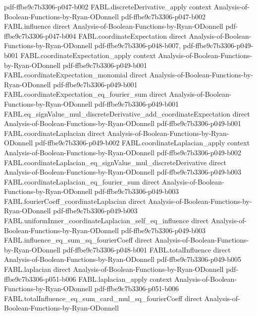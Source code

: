 \begin{theorem}
{    pdf-ffbe9c7b3306-p047-b002}
\proofstep
  {FABL.discreteDerivative_apply}
  {context}
  {Analysis-of-Boolean-Functions-by-Ryan-ODonnell}
  {pdf-ffbe9c7b3306-p047-b002}
\proofstep
  {FABL.influence}
  {direct}
  {Analysis-of-Boolean-Functions-by-Ryan-ODonnell}
  {pdf-ffbe9c7b3306-p047-b004}
\proofstep
  {FABL.coordinateExpectation}
  {direct}
  {Analysis-of-Boolean-Functions-by-Ryan-ODonnell}
  {pdf-ffbe9c7b3306-p048-b007,
    pdf-ffbe9c7b3306-p049-b001}
\proofstep
  {FABL.coordinateExpectation_apply}
  {context}
  {Analysis-of-Boolean-Functions-by-Ryan-ODonnell}
  {pdf-ffbe9c7b3306-p049-b001}
\proofstep
  {FABL.coordinateExpectation_monomial}
  {direct}
  {Analysis-of-Boolean-Functions-by-Ryan-ODonnell}
  {pdf-ffbe9c7b3306-p049-b001}
\proofstep
  {FABL.coordinateExpectation_eq_fourier_sum}
  {direct}
  {Analysis-of-Boolean-Functions-by-Ryan-ODonnell}
  {pdf-ffbe9c7b3306-p049-b001}
\proofstep
  {FABL.eq_signValue_mul_discreteDerivative_add_coordinateExpectation}
  {direct}
  {Analysis-of-Boolean-Functions-by-Ryan-ODonnell}
  {pdf-ffbe9c7b3306-p049-b001}
\proofstep
  {FABL.coordinateLaplacian}
  {direct}
  {Analysis-of-Boolean-Functions-by-Ryan-ODonnell}
  {pdf-ffbe9c7b3306-p049-b002}
\proofstep
  {FABL.coordinateLaplacian_apply}
  {context}
  {Analysis-of-Boolean-Functions-by-Ryan-ODonnell}
  {pdf-ffbe9c7b3306-p049-b002}
\proofstep
  {FABL.coordinateLaplacian_eq_signValue_mul_discreteDerivative}
  {direct}
  {Analysis-of-Boolean-Functions-by-Ryan-ODonnell}
  {pdf-ffbe9c7b3306-p049-b003}
\proofstep
  {FABL.coordinateLaplacian_eq_fourier_sum}
  {direct}
  {Analysis-of-Boolean-Functions-by-Ryan-ODonnell}
  {pdf-ffbe9c7b3306-p049-b003}
\proofstep
  {FABL.fourierCoeff_coordinateLaplacian}
  {direct}
  {Analysis-of-Boolean-Functions-by-Ryan-ODonnell}
  {pdf-ffbe9c7b3306-p049-b003}
\proofstep
  {FABL.uniformInner_coordinateLaplacian_self_eq_influence}
  {direct}
  {Analysis-of-Boolean-Functions-by-Ryan-ODonnell}
  {pdf-ffbe9c7b3306-p049-b003}
\proofstep
  {FABL.influence_eq_sum_sq_fourierCoeff}
  {direct}
  {Analysis-of-Boolean-Functions-by-Ryan-ODonnell}
  {pdf-ffbe9c7b3306-p048-b001}
\proofstep
  {FABL.totalInfluence}
  {direct}
  {Analysis-of-Boolean-Functions-by-Ryan-ODonnell}
  {pdf-ffbe9c7b3306-p049-b005}
\proofstep
  {FABL.laplacian}
  {direct}
  {Analysis-of-Boolean-Functions-by-Ryan-ODonnell}
  {pdf-ffbe9c7b3306-p051-b006}
\proofstep
  {FABL.laplacian_apply}
  {context}
  {Analysis-of-Boolean-Functions-by-Ryan-ODonnell}
  {pdf-ffbe9c7b3306-p051-b006}
\proofstep
  {FABL.totalInfluence_eq_sum_card_mul_sq_fourierCoeff}
  {direct}
  {Analysis-of-Boolean-Functions-by-Ryan-ODonnell}

\end{theorem}
